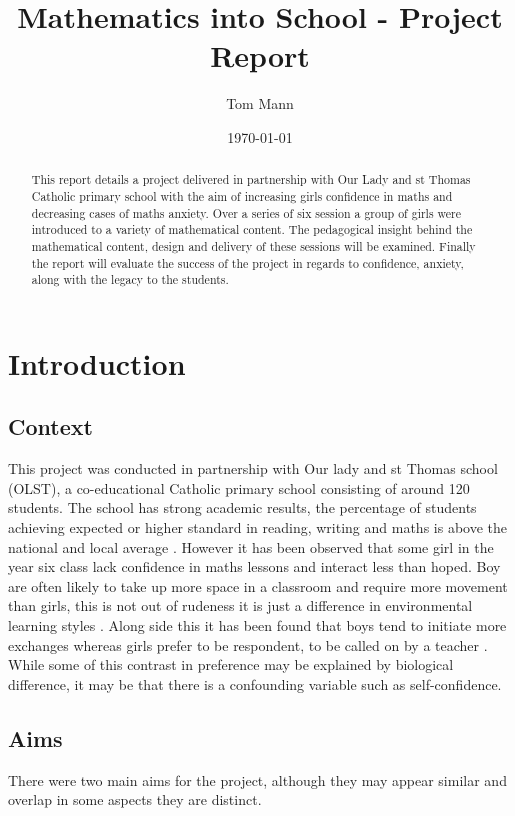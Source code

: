 \documentclass[11pt, a4paper, notitlepage]{article}
\title{Mathematics into School - Project Report}
\author{Tom Mann}
\date{\today}
\begin{document}
\maketitle

\begin{abstract}
    This report details a project delivered in partnership with Our Lady and st Thomas Catholic primary school with the aim of increasing girls confidence in maths and decreasing cases of maths anxiety. Over a series of six session a group of girls were introduced to a variety of mathematical content. The pedagogical insight behind the mathematical content, design and delivery of these sessions will be examined. Finally the report will evaluate the success of the project in regards to confidence, anxiety, along with the legacy to the students.
\end{abstract}

\tableofcontents

\clearpage

\section{Introduction}
\subsection{Context}
This project was conducted in partnership with Our lady and st Thomas school (OLST), a  co-educational Catholic primary school consisting of around 120 students. The school has strong academic results, the percentage of students achieving expected or higher standard in reading, writing and maths is above the national and local average \cite{OLST_stats}. However it has been observed that some girl in the year six class lack confidence in maths lessons and interact less than hoped. Boy are often likely to take up more space in a classroom and require more movement than girls, this is not out of rudeness it is just a difference in environmental learning styles \cite{Hughes:2006}. Along side this it has been found that boys tend to initiate more exchanges whereas girls prefer to be respondent, to be called on by a teacher \cite{Rashid:2012}. While some of this contrast in preference may be explained by biological difference, it may be that there is a confounding variable such as self-confidence.


\subsection{Aims}
There were two main aims for the project, although they may appear similar and overlap in some aspects they are distinct.
\end{document}

